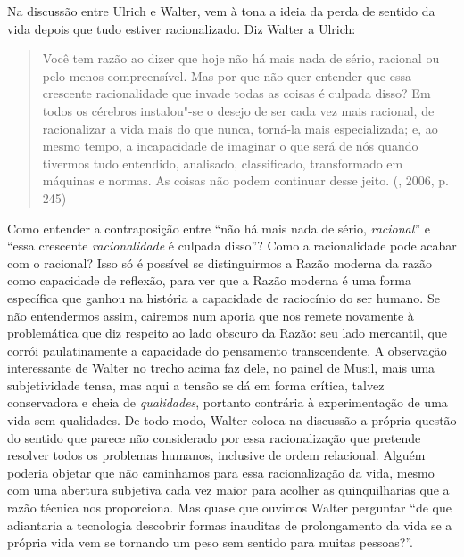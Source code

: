 Na discussão entre Ulrich e Walter, vem à tona a ideia da perda de
sentido da vida depois que tudo estiver racionalizado. Diz Walter a
Ulrich:

\begin{quote}
Você tem razão ao dizer que hoje não há mais nada de sério, racional ou
pelo menos compreensível. Mas por que não quer entender que essa
crescente racionalidade que invade todas as coisas é culpada disso? Em
todos os cérebros instalou"-se o desejo de ser cada vez mais racional, de
racionalizar a vida mais do que nunca, torná-la mais especializada; e,
ao mesmo tempo, a incapacidade de imaginar o que será de nós quando
tivermos tudo entendido, analisado, classificado, transformado em
máquinas e normas. As coisas não podem continuar desse jeito. (,
2006, p. 245)
\end{quote}

Como entender a contraposição entre ``não há mais nada de sério,
\emph{racional}'' e ``essa crescente \emph{racionalidade} é culpada
disso''? Como a racionalidade pode acabar com o racional? Isso só é
possível se distinguirmos a Razão moderna da razão como capacidade de
reflexão, para ver que a Razão moderna é uma forma específica que ganhou
na história a capacidade de raciocínio do ser humano. Se não entendermos
assim, cairemos num aporia que nos remete novamente à problemática que
diz respeito ao lado obscuro da Razão: seu lado mercantil, que corrói
paulatinamente a capacidade do pensamento transcendente. A observação
interessante de Walter no trecho acima faz dele, no painel de Musil,
mais uma subjetividade tensa, mas aqui a tensão se dá em forma crítica,
talvez conservadora e cheia de \emph{qualidades}, portanto contrária à
experimentação de uma vida sem qualidades. De todo modo, Walter coloca
na discussão a própria questão do sentido que parece não considerado por
essa racionalização que pretende resolver todos os problemas humanos,
inclusive de ordem relacional. Alguém poderia objetar que não caminhamos
para essa racionalização da vida, mesmo com uma abertura subjetiva cada
vez maior para acolher as quinquilharias que a razão técnica nos
proporciona. Mas quase que ouvimos Walter perguntar ``de que adiantaria
a tecnologia descobrir formas inauditas de prolongamento da vida se a
própria vida vem se tornando um peso sem sentido para muitas pessoas?''.

